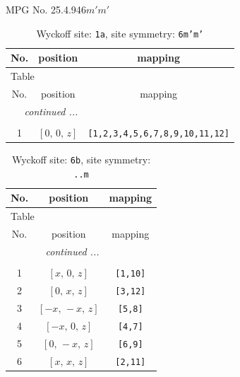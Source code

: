 \documentclass[fleqn,8pt]{jsarticle}
\begin{document}
\setcounter{MaxMatrixCols}{32}

\renewcommand{\tablename}{Table~}
\renewcommand{\figurename}{Figure~}
\begin{center}
\LARGE
MPG No. 25.4.94\quad$6m'm'$
\end{center}
\renewcommand{\arraystretch}{1.2}
\begin{longtable}{ccc}
\caption{Wyckoff site: {\tt 1a}, site symmetry: {\tt 6m'm'}}
 \\
 \hline \hline
No. & position & mapping \\ \hline \endfirsthead

\multicolumn{2}{l}{\tablename\ \thetable{}} \\
 \hline \hline
No. & position & mapping \\ \hline \endhead

 \hline \hline
\multicolumn{2}{r}{\footnotesize\it continued ...} \\ \endfoot

 \hline \hline
\multicolumn{2}{r}{} \\ \endlastfoot

1 & $\left[ 0,\, 0,\, z \right]$ & {\tt [1,2,3,4,5,6,7,8,9,10,11,12]} \\
\end{longtable}
\renewcommand{\arraystretch}{1.2}
\begin{longtable}{ccc}
\caption{Wyckoff site: {\tt 6b}, site symmetry: {\tt ..m}}
 \\
 \hline \hline
No. & position & mapping \\ \hline \endfirsthead

\multicolumn{2}{l}{\tablename\ \thetable{}} \\
 \hline \hline
No. & position & mapping \\ \hline \endhead

 \hline \hline
\multicolumn{2}{r}{\footnotesize\it continued ...} \\ \endfoot

 \hline \hline
\multicolumn{2}{r}{} \\ \endlastfoot

1 & $\left[ x,\, 0,\, z \right]$ & {\tt [1,10]} \\ \hline
2 & $\left[ 0,\, x,\, z \right]$ & {\tt [3,12]} \\ \hline
3 & $\left[ - x,\, - x,\, z \right]$ & {\tt [5,8]} \\ \hline
4 & $\left[ - x,\, 0,\, z \right]$ & {\tt [4,7]} \\ \hline
5 & $\left[ 0,\, - x,\, z \right]$ & {\tt [6,9]} \\ \hline
6 & $\left[ x,\, x,\, z \right]$ & {\tt [2,11]} \\
\end{longtable}
\end{document}

